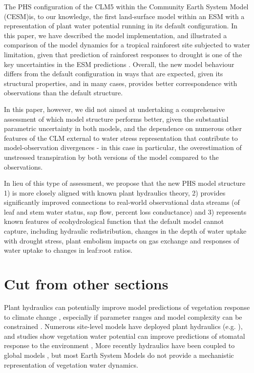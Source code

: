 \documentclass[draft,linenumbers]{agujournal}
\begin{document}
    The PHS configuration of the CLM5 within the Community Earth System Model (CESM)is, to our knowledge, the first land-surface model within an ESM with a representation of plant water potential running in its default configuration. In this paper, we have described the model implementation, and illustrated a comparison of the model dynamics for a tropical rainforest site subjected to water limitation, given that prediction of rainforest responses to drought is one of the key uncertainties in the ESM predictions \citep{huntingford2013}. Overall, the new model behaviour differs from the default configuration in ways that are expected, given its structural properties, and in many cases, provides better correspondence with observations than the default structure. 
    
    In this paper, however, we did not aimed at undertaking a comprehensive assessment of which model structure performs better, given the substantial parametric uncertainty in both models, and the dependence on numerous other features of the CLM external to water stress representation that contribute to model-observation divergences - in this case in particular, the overestimation of unstressed transpiration by both versions of the model compared to the observations. 
    
    In lieu of this type of assessment, we propose that the new PHS model structure 1) is more closely aligned with known plant hydraulics theory, 2) provides significantly improved connections to real-world observational data streams (of leaf and stem water status, sap flow, percent loss conductance) and 3) represents known features of ecohydrological function that the default model cannot capture, including hydraulic redistribution, changes in the depth of water uptake with drought stress, plant embolism impacts on gas exchange and responses of water uptake to changes in leaf:root ratios. 
    
\section{Cut from other sections}
    Plant hydraulics can potentially improve model predictions of vegetation response to climate change \citep{sperry2015}, 
    especially if parameter ranges and model complexity can be constrained \citep{rogers2017}.
    Numerous site-level models have deployed plant hydraulics (e.g. \citet{williams1996,sperry1998,bohrer2005}), and studies show
    vegetation water potential can improve predictions of stomatal response to the environment \citep{sperry2017,anderegg2017},
    More recently hydraulics have been coupled to global models \citep{bonan2014,xu2016,christoffersen2016}, 
    but most Earth System Models do not provide a mechanistic representation of vegetation water dynamics.
    
\end{document}
